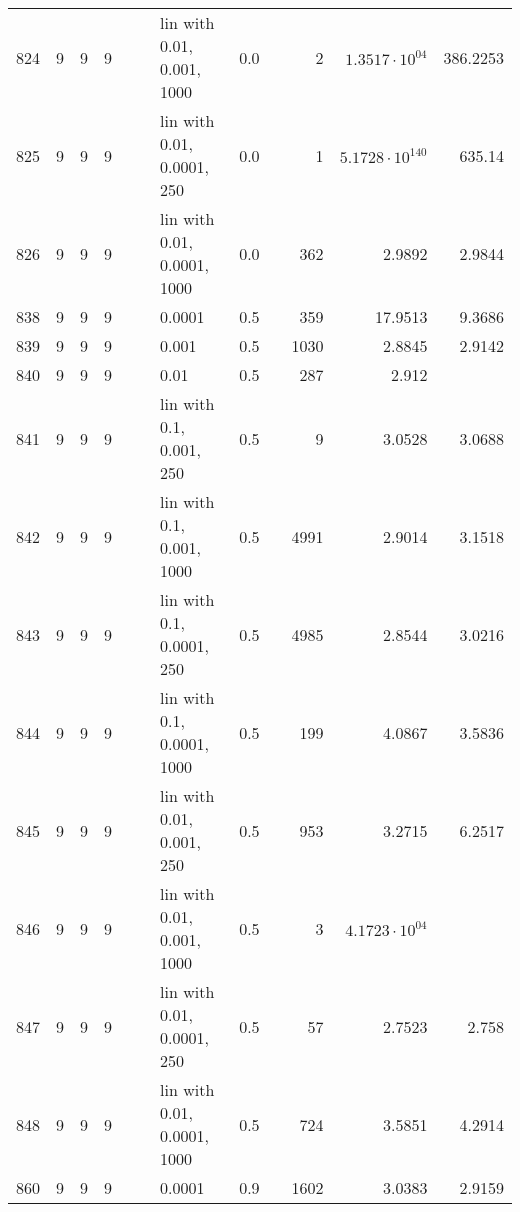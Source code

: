 \begin{longtable}{lrrrrrlrrrrr}
 824 &       9 & 9 & 9 &   &   &  lin with 0.01, 0.001, 1000 &  0.0 &        &       2 &  $1.3517\cdot 10^{04}$ &               386.2253 \\
 825 &       9 & 9 & 9 &   &   &  lin with 0.01, 0.0001, 250 &  0.0 &        &       1 & $5.1728\cdot 10^{140}$ &                 635.14 \\
 826 &       9 & 9 & 9 &   &   & lin with 0.01, 0.0001, 1000 &  0.0 &        &     362 &                 2.9892 &                 2.9844 \\
 838 &       9 & 9 & 9 &   &   &                      0.0001 &  0.5 &        &     359 &                17.9513 &                 9.3686 \\
 839 &       9 & 9 & 9 &   &   &                       0.001 &  0.5 &        &    1030 &                 2.8845 &                 2.9142 \\
 840 &       9 & 9 & 9 &   &   &                        0.01 &  0.5 &        &     287 &                  2.912 &                        \\
 841 &       9 & 9 & 9 &   &   &    lin with 0.1, 0.001, 250 &  0.5 &        &       9 &                 3.0528 &                 3.0688 \\
 842 &       9 & 9 & 9 &   &   &   lin with 0.1, 0.001, 1000 &  0.5 &        &    4991 &                 2.9014 &                 3.1518 \\
 843 &       9 & 9 & 9 &   &   &   lin with 0.1, 0.0001, 250 &  0.5 &        &    4985 &                 2.8544 &                 3.0216 \\
 844 &       9 & 9 & 9 &   &   &  lin with 0.1, 0.0001, 1000 &  0.5 &        &     199 &                 4.0867 &                 3.5836 \\
 845 &       9 & 9 & 9 &   &   &   lin with 0.01, 0.001, 250 &  0.5 &        &     953 &                 3.2715 &                 6.2517 \\
 846 &       9 & 9 & 9 &   &   &  lin with 0.01, 0.001, 1000 &  0.5 &        &       3 &  $4.1723\cdot 10^{04}$ &                        \\
 847 &       9 & 9 & 9 &   &   &  lin with 0.01, 0.0001, 250 &  0.5 &        &      57 &                 2.7523 &                  2.758 \\
 848 &       9 & 9 & 9 &   &   & lin with 0.01, 0.0001, 1000 &  0.5 &        &     724 &                 3.5851 &                 4.2914 \\
 860 &       9 & 9 & 9 &   &   &                      0.0001 &  0.9 &        &    1602 &                 3.0383 &                 2.9159 \\

\end{longtable}
